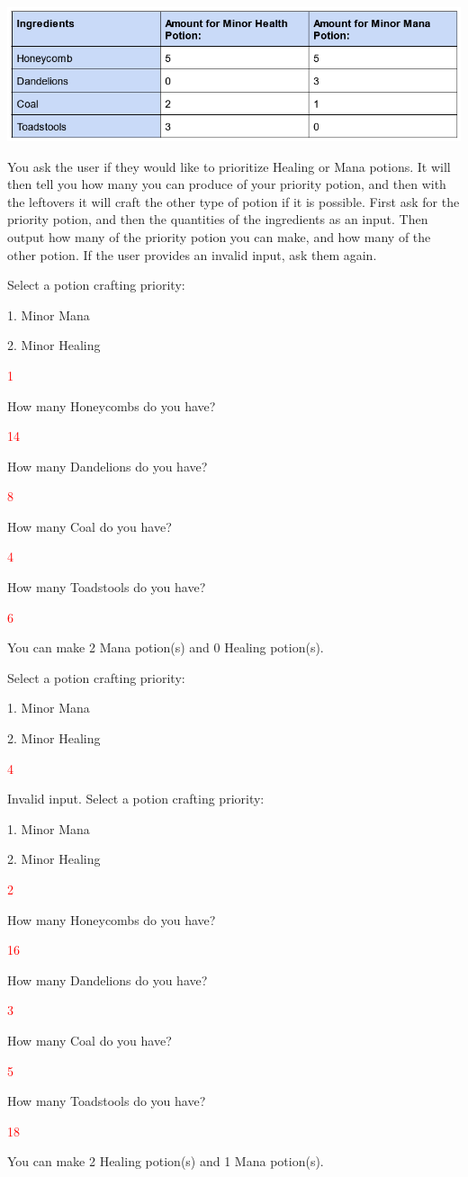 \includegraphics[width=\textwidth]{images/PotionIngredients.PNG}

You ask the user if they would like to prioritize Healing or Mana potions. It will then tell you how many you can produce of your priority potion, and then with the leftovers it will craft the other type of potion if it is possible. First ask for the priority potion, and then the quantities of the ingredients as an input. Then output how many of the priority potion you can make, and how many of the other potion. If the user provides an invalid input, ask them again.

\begin{sample}
Select a potion crafting priority:

1. Minor Mana

2. Minor Healing

\textcolor{red}{1}

How many Honeycombs do you have?

\textcolor{red}{14}

How many Dandelions do you have?

\textcolor{red}{8}

How many Coal do you have?

\textcolor{red}{4}

How many Toadstools do you have?

\textcolor{red}{6}

You can make 2 Mana potion(s) and 0 Healing potion(s).
\end{sample}

\begin{sample}
Select a potion crafting priority:

1. Minor Mana

2. Minor Healing

\textcolor{red}{4}

Invalid input. Select a potion crafting priority:

1. Minor Mana

2. Minor Healing

\textcolor{red}{2}

How many Honeycombs do you have?

\textcolor{red}{16}

How many Dandelions do you have?

\textcolor{red}{3}

How many Coal do you have?

\textcolor{red}{5}

How many Toadstools do you have?

\textcolor{red}{18}

You can make 2 Healing potion(s) and 1 Mana potion(s).
\end{sample}

